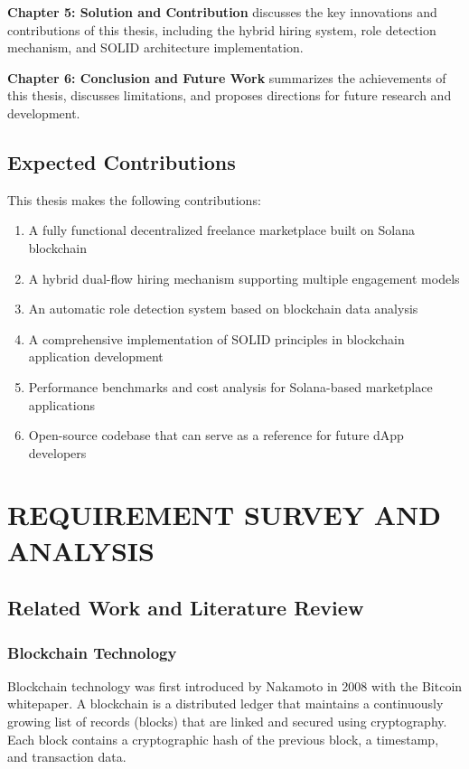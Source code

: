 \documentclass[a4paper,13pt,twoside]{report}
\theoremstyle{definition}
\begin{document}
\textbf{Chapter 5: Solution and Contribution} discusses the key innovations and contributions of this thesis, including the hybrid hiring system, role detection mechanism, and SOLID architecture implementation.

\textbf{Chapter 6: Conclusion and Future Work} summarizes the achievements of this thesis, discusses limitations, and proposes directions for future research and development.

\section{Expected Contributions}

This thesis makes the following contributions:

\begin{enumerate}
    \item A fully functional decentralized freelance marketplace built on Solana blockchain
    \item A hybrid dual-flow hiring mechanism supporting multiple engagement models
    \item An automatic role detection system based on blockchain data analysis
    \item A comprehensive implementation of SOLID principles in blockchain application development
    \item Performance benchmarks and cost analysis for Solana-based marketplace applications
    \item Open-source codebase that can serve as a reference for future dApp developers
\end{enumerate}

\newpage
\chapter{REQUIREMENT SURVEY AND ANALYSIS}
\label{chapter:Related_works}

\section{Related Work and Literature Review}

\subsection{Blockchain Technology}

Blockchain technology was first introduced by Nakamoto in 2008 with the Bitcoin whitepaper\cite{nakamoto2008bitcoin}. A blockchain is a distributed ledger that maintains a continuously growing list of records (blocks) that are linked and secured using cryptography. Each block contains a cryptographic hash of the previous block, a timestamp, and transaction data.
\end{document}
